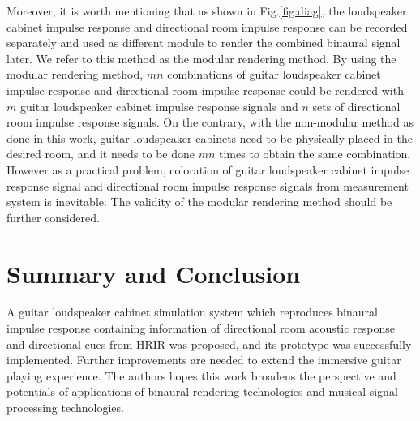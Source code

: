 \documentclass[convention,e-brief]{aesconf-current}
\begin{document}
Moreover, it is worth mentioning that as shown in Fig.\ref{fig:diag}, the loudspeaker cabinet impulse response and directional room impulse response can be recorded separately and used as different module to render the combined binaural signal later.
We refer to this method as the modular rendering method.
By using the modular rendering method, $mn$ combinations of guitar loudspeaker cabinet impulse response and directional room impulse response could be rendered with $m$ guitar loudspeaker cabinet impulse response signals and $n$ sets of directional room impulse response signals.
On the contrary, with the non-modular method as done in this work, guitar loudspeaker cabinets need to be physically placed in the desired room, and it needs to be done $mn$ times to obtain the same combination.
However as a practical problem, coloration of guitar loudspeaker cabinet impulse response signal and directional room impulse response signals from measurement system is inevitable.
The validity of the modular rendering method should be further considered.

\section{Summary and Conclusion}

A guitar loudspeaker cabinet simulation system which reproduces binaural impulse response containing information of directional room acoustic response and directional cues from HRIR was proposed, and its prototype was successfully implemented.
Further improvements are needed to extend the immersive guitar playing experience.
The authors hopes this work broadens the perspective and potentials of applications of binaural rendering technologies and musical signal processing technologies.





\end{document}
